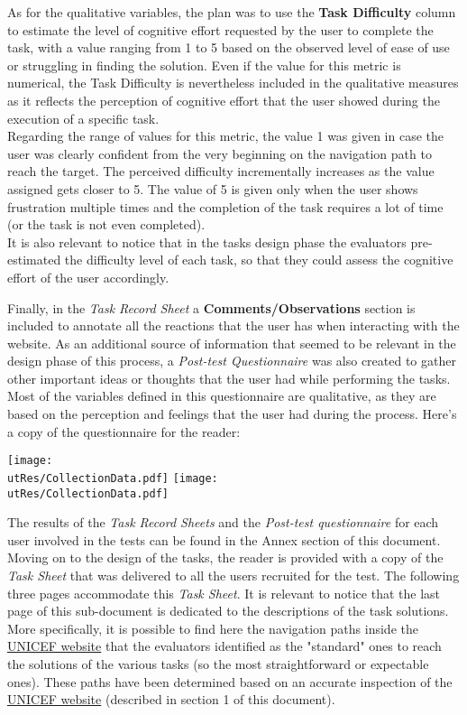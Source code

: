 As for the qualitative variables, the plan was to use the \textbf{Task Difficulty} column to estimate the level of cognitive effort requested by the user to complete the task, with a value ranging from 1 to 5 based on the observed level of ease of use or struggling in finding the solution. Even if the value for this metric is numerical, the Task Difficulty is nevertheless included in the qualitative measures as it reflects the perception of cognitive effort that the user showed during the execution of a specific task.\\ Regarding the range of values for this metric, the value 1 was given in case the user was clearly confident from the very beginning on the navigation path to reach the target. The perceived difficulty incrementally increases as the value assigned gets closer to 5. The value of 5 is given only when the user shows frustration multiple times and the completion of the task requires a lot of time (or the task is not even completed).\\
It is also relevant to notice that in the tasks design phase the evaluators pre-estimated the difficulty level of each task, so that they could assess the cognitive effort of the user accordingly.

Finally, in the \textit{Task Record Sheet} a \textbf{Comments/Observations} section is included to annotate all the reactions that the user has when interacting with the website.
As an additional source of information that seemed to be relevant in the design phase of this process, a \textit{Post-test Questionnaire} was also created to gather other important ideas or thoughts that the user had while performing the tasks. Most of the variables defined in this questionnaire are qualitative, as they are based on the perception and feelings that the user had during the process.
Here's a copy of the questionnaire for the reader:

\begin{center}
	\texttt{[image: \\utRes/CollectionData.pdf]}
	\texttt{[image: \\utRes/CollectionData.pdf]}
\end{center}

The results of the \textit{Task Record Sheets} and the \textit{Post-test questionnaire} for each user involved in the tests can be found in the Annex section of this document.\\
 
 
Moving on to the design of the tasks, the reader is provided with a copy of the \textit{Task Sheet} that was delivered to all the users recruited for the test. The following three pages accommodate this \textit{Task Sheet}. It is relevant to notice that the last page of this sub-document is dedicated to the descriptions of the task solutions. More specifically, it is possible to find here the navigation paths inside the \href{https://www.unicef.org/}{UNICEF website} that the evaluators identified as the "standard" ones to reach the solutions of the various tasks (so the most straightforward or expectable ones). These paths have been determined based on an accurate inspection of the \href{https://www.unicef.org/}{UNICEF website} (described in section 1 of this document). 

